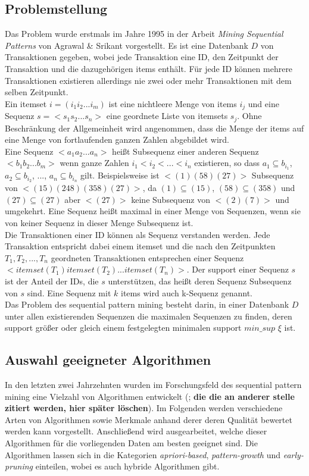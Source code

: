 \subsection{Problemstellung}
Das Problem wurde erstmals im Jahre 1995 in der Arbeit \textit{Mining Sequential Patterns} \cite{aprioriall} von Agrawal \& Srikant vorgestellt. Es ist eine Datenbank $D$ von Transaktionen gegeben, wobei jede Transaktion eine ID, den Zeitpunkt der Transaktion und die dazugehörigen items enthält. Für jede ID können mehrere Transaktionen existieren allerdings nie zwei oder mehr Transaktionen mit dem selben Zeitpunkt.\\
Ein itemset $i=(i_1i_2...i_m)$ ist eine nichtleere Menge von items $i_j$ und eine Sequenz $s=<s_1s_2...s_n>$ eine geordnete Liste von itemsets $s_j$. Ohne Beschränkung der Allgemeinheit wird angenommen, dass die Menge der items auf eine Menge von fortlaufenden ganzen Zahlen abgebildet wird.\\
Eine Sequenz $<a_1a_2...a_n>$ heißt Subsequenz einer anderen Sequenz $<b_1b_2...b_m>$ wenn ganze Zahlen $i_1<i_2<...<i_n$ existieren, so dass $a_1\subseteq b_{i_1}$, $a_2\subseteq b_{i_2}$, ..., $a_n\subseteq b_{i_n}$ gilt. Beispielsweise ist $<(1)(58)(27)>$ Subsequenz von $<(15)(248)(358)(27)>$, da $(1)\subseteq(15)$, $(58)\subseteq(358)$ und $(27)\subseteq(27)$ aber $<(27)>$ keine Subsequenz von $<(2)(7)>$ und umgekehrt. Eine Sequenz heißt maximal in einer Menge von Sequenzen, wenn sie von keiner Sequenz in dieser Menge Subsequenz ist.\\
Die Transaktionen einer ID können als Sequenz verstanden werden. Jede Transaktion entspricht dabei einem itemset und die nach den Zeitpunkten $T_1,T_2,...,T_n$ geordneten Transaktionen entsprechen einer Sequenz $<itemset(T_1)itemset(T_2)...itemset(T_n)>$. Der support einer Sequenz $s$ ist der Anteil der IDs, die $s$ unterstützen, das heißt deren Sequenz Subsequenz von $s$ sind. Eine Sequenz mit $k$ items wird auch k-Sequenz genannt.\\
Das Problem des sequential pattern mining besteht darin, in einer Datenbank $D$ unter allen existierenden Sequenzen die maximalen Sequenzen zu finden, deren support größer oder gleich einem festgelegten minimalen support $min\_sup$ $\xi$ ist.

\subsection{Auswahl geeigneter Algorithmen}

In den letzten zwei Jahrzehnten wurden im Forschungsfeld des sequential pattern mining eine Vielzahl von Algorithmen entwickelt (\cite{hvsm,lapin,aprioriall,gsp,psp,spam,freespan,prefixspan,wapmine,fsminer,discall,spade,plwap}; \textbf{die die an anderer stelle zitiert werden, hier später löschen}). Im Folgenden werden verschiedene Arten von Algorithmen sowie Merkmale anhand derer deren Qualität bewertet werden kann vorgestellt. Anschließend wird ausgearbeitet, welche dieser Algorithmen für die vorliegenden Daten am besten geeignet sind. Die Algorithmen lassen sich in die Kategorien \textit{apriori-based}, \textit{pattern-growth} und \textit{early-pruning} einteilen, wobei es auch hybride Algorithmen gibt.\\


